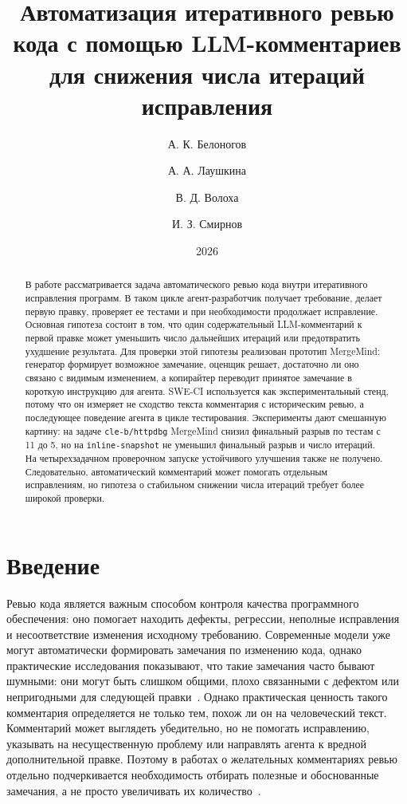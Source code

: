 \documentclass[12pt,a4paper]{article}
\title{Автоматизация итеративного ревью кода с помощью LLM-комментариев для снижения числа итераций исправления}
\author{А. К. Белоногов \and А. А. Лаушкина \and В. Д. Волоха \and И. З. Смирнов}
\date{2026}
\begin{document}
\maketitle

\begin{abstract}
В работе рассматривается задача автоматического ревью кода внутри итеративного
исправления программ. В таком цикле агент-разработчик получает требование,
делает первую правку, проверяет ее тестами и при необходимости продолжает
исправление. Основная гипотеза состоит в том, что один содержательный
LLM-комментарий к первой правке может уменьшить число дальнейших итераций или
предотвратить ухудшение результата. Для проверки этой гипотезы реализован
прототип MergeMind: генератор формирует возможное замечание, оценщик решает,
достаточно ли оно связано с видимым изменением, а копирайтер переводит принятое
замечание в короткую инструкцию для агента. SWE-CI используется как
экспериментальный стенд, потому что он измеряет не сходство текста комментария с
историческим ревью, а последующее поведение агента в цикле тестирования.
Эксперименты дают смешанную картину: на задаче \texttt{cle-b/httpdbg}
MergeMind снизил финальный разрыв по тестам с 11 до 5, но на
\texttt{inline-snapshot} не уменьшил финальный разрыв и число итераций. На
четырехзадачном проверочном запуске устойчивого улучшения также не получено.
Следовательно, автоматический комментарий может помогать отдельным
исправлениям, но гипотеза о стабильном снижении числа итераций требует более
широкой проверки.
\end{abstract}

\section{Введение}

Ревью кода является важным способом контроля качества программного обеспечения:
оно помогает находить дефекты, регрессии, неполные исправления и несоответствие
изменения исходному требованию. Современные модели уже могут автоматически
формировать замечания по изменению кода, однако практические исследования
показывают, что такие замечания часто бывают шумными: они могут быть слишком
общими, плохо связанными с дефектом или непригодными для следующей
правки~\cite{acrpractice,desiview}.
Однако практическая ценность такого комментария определяется не только тем,
похож ли он на человеческий текст. Комментарий может выглядеть убедительно, но
не помогать исправлению, указывать на несущественную проблему или направлять
агента к вредной дополнительной правке. Поэтому в работах о желательных
комментариях ревью отдельно подчеркивается необходимость отбирать полезные и
обоснованные замечания, а не просто увеличивать их количество~\cite{desiview}.
\end{document}
